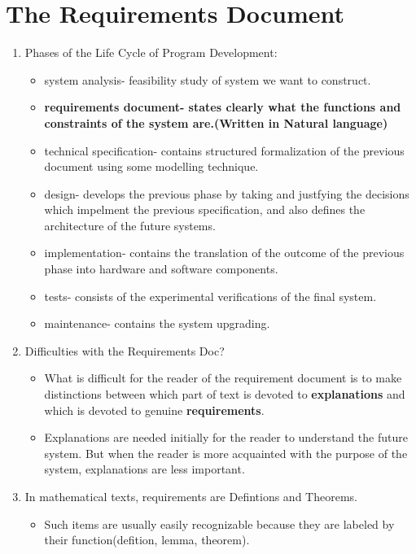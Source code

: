 \documentclass{article}
\begin{document}
  \section{The Requirements Document}
  \begin{enumerate}
      \item Phases of the Life Cycle of Program Development:\begin{itemize}
          \item system analysis- feasibility study of system we want to construct.
          \item \textbf{requirements document- states clearly what the functions and constraints of the system are.(Written in Natural language)}
          \item technical specification- contains structured formalization of the previous document using some modelling technique.
          \item design- develops the previous phase by taking and justfying the decisions which impelment the previous specification, and 
          also defines the architecture of the future systems.
          \item implementation- contains the translation of the outcome of the previous phase into hardware and software components.
          \item tests- consists of the experimental verifications of the final system.
          \item maintenance- contains the system upgrading.
      \end{itemize}
      \item Difficulties with the Requirements Doc?\begin{itemize}
        \item What is difficult for the reader of the requirement document is to make distinctions between which part of text
        is devoted to \textbf{explanations} and which is devoted to genuine \textbf{requirements}.
        \item Explanations are needed initially for the reader to
        understand the future system. But when the reader is more acquainted
        with the purpose of the system, explanations are less important.
      \end{itemize}
      \item In mathematical texts, requirements are Defintions and Theorems. \begin{itemize}
        \item Such items are usually easily recognizable because they are labeled by their function(defition, lemma, theorem).

\end{itemize}
\end{enumerate}
\end{document}
